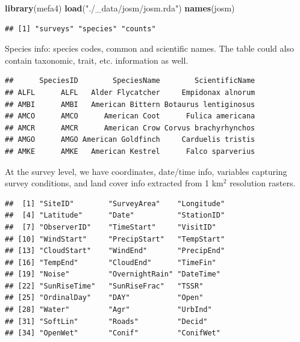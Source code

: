 \documentclass[12pt,]{book}
\newenvironment{Shaded}{\begin{snugshade}}{\end{snugshade}}
\newcommand{\KeywordTok}[1]{\textcolor[rgb]{0.13,0.29,0.53}{\textbf{#1}}}
\newcommand{\NormalTok}[1]{#1}
\newcommand{\OperatorTok}[1]{\textcolor[rgb]{0.81,0.36,0.00}{\textbf{#1}}}
\newcommand{\StringTok}[1]{\textcolor[rgb]{0.31,0.60,0.02}{#1}}
\begin{document}
\begin{Shaded}
\begin{Highlighting}[]
\KeywordTok{library}\NormalTok{(mefa4)}
\KeywordTok{load}\NormalTok{(}\StringTok{"./_data/josm/josm.rda"}\NormalTok{)}
\KeywordTok{names}\NormalTok{(josm)}
\end{Highlighting}
\end{Shaded}

\begin{verbatim}
## [1] "surveys" "species" "counts"
\end{verbatim}

Species info: species codes, common and scientific names. The table could also contain
taxonomic, trait, etc. information as well.

\begin{Shaded}
\end{Shaded}

\begin{verbatim}
##      SpeciesID        SpeciesName        ScientificName
## ALFL      ALFL   Alder Flycatcher     Empidonax alnorum
## AMBI      AMBI   American Bittern Botaurus lentiginosus
## AMCO      AMCO      American Coot      Fulica americana
## AMCR      AMCR      American Crow Corvus brachyrhynchos
## AMGO      AMGO American Goldfinch     Carduelis tristis
## AMKE      AMKE   American Kestrel      Falco sparverius
\end{verbatim}

At the survey level, we have coordinates, date/time info,
variables capturing survey conditions, and land cover info extracted from 1 km\(^2\) resolution rasters.

\begin{Shaded}
\end{Shaded}

\begin{verbatim}
##  [1] "SiteID"        "SurveyArea"    "Longitude"    
##  [4] "Latitude"      "Date"          "StationID"    
##  [7] "ObserverID"    "TimeStart"     "VisitID"      
## [10] "WindStart"     "PrecipStart"   "TempStart"    
## [13] "CloudStart"    "WindEnd"       "PrecipEnd"    
## [16] "TempEnd"       "CloudEnd"      "TimeFin"      
## [19] "Noise"         "OvernightRain" "DateTime"     
## [22] "SunRiseTime"   "SunRiseFrac"   "TSSR"         
## [25] "OrdinalDay"    "DAY"           "Open"         
## [28] "Water"         "Agr"           "UrbInd"       
## [31] "SoftLin"       "Roads"         "Decid"        
## [34] "OpenWet"       "Conif"         "ConifWet"
\end{verbatim}
\end{document}
